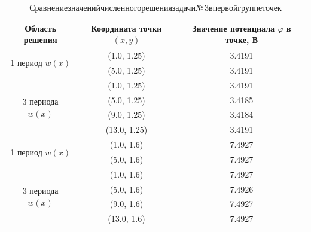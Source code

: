 \documentclass[12pt, a4paper]{article}
\renewcommand{\phi}{\varphi}
\begin{document}
			\begin{table}[!h]
				\centering
				\caption{ Сравнение\;значений\;численного\;решения\;задачи\;№\,3\;в\;первой\;группе\;точек 
				}
				\vspace*{2mm}
				\begin{tabular}{|c|c|c|}
					\hline
					Область решения
					& Координата точки $(x, y)$
					& Значение потенциала $\phi$ в точке, В\\ 
					
					\hline
					\hline
					
					\multirow{2}{*}{1 период $w(x)$}  
					& (1.0, 1.25)             
					& 3.4191          \\ 
					\cline{2-3} 
					
					& (5.0, 1.25)             
					& 3.4191          \\ 
					
					\hline
					
					\multirow{4}{*}{3 периода $w(x)$} 
					& (1.0, 1.25)             
					& 3.4191          \\ 
					\cline{2-3} 
					& (5.0, 1.25)             
					& 3.4185          \\ \cline{2-3} 
					& (9.0, 1.25)             
					& 3.4184          \\ \cline{2-3} 
					& (13.0, 1.25)            
					& 3.4191          \\ 
					
					\hline
					\hline
					
					\multirow{2}{*}{1 период $w(x)$}  
					& (1.0, 1.6)            
					& 7.4927          \\ 
					\cline{2-3} 
					
					& (5.0, 1.6)             
					& 7.4927          \\ 
					\hline
					\multirow{4}{*}{3 периода $w(x)$} 
					& (1.0, 1.6)             
					& 7.4927          \\ 
					\cline{2-3} 
					
					& (5.0, 1.6)             
					& 7.4926          \\ 
					\cline{2-3} 
					& (9.0, 1.6)             
					& 7.4927          \\ 
					\cline{2-3} 
					& (13.0, 1.6)            
					& 7.4927        \\ 
					\hline
					
					
				\end{tabular}
				\label{table:comparison_sin_0001_1}
			\end{table}
			
\end{document}
